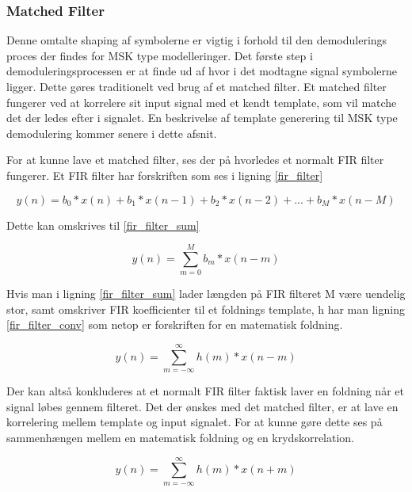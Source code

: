 \begin{appendices}
\subsubsection{Matched Filter} \label{matched_filter_heading}

Denne omtalte shaping af symbolerne er vigtig i forhold til den demodulerings proces der findes for MSK type modelleringer. Det første step i demoduleringsprocessen er at finde ud af hvor i det modtagne signal symbolerne ligger. Dette gøres traditionelt ved brug af et matched filter. Et matched filter fungerer ved at korrelere sit input signal med et kendt template, som vil matche det der ledes efter i signalet. En beskrivelse af template generering til MSK type demodulering kommer senere i dette afsnit. 

For at kunne lave et matched filter, ses der på hvorledes et normalt FIR filter fungerer. Et FIR filter har forskriften som ses i ligning \ref{fir_filter}

\begin{equation} \label{fir_filter}
y(n) = b_0 * x(n) + b_1 * x(n-1) + b_2 * x(n-2) + ... + b_M * x(n - M)
\end{equation}

Dette kan omskrives til \ref{fir_filter_sum}

\begin{equation} \label{fir_filter_sum}
y(n) = \sum_{m = 0}^{M} b_m * x(n - m)
\end{equation}

Hvis man i ligning \ref{fir_filter_sum} lader længden på FIR filteret M være uendelig stor, samt omskriver FIR koefficienter til et foldnings template, h har man ligning \ref{fir_filter_conv} som netop er forskriften for en matematisk foldning.

\begin{equation} \label{fir_filter_conv}
y(n) = \sum_{m = -\infty}^{\infty} h(m) * x(n - m)
\end{equation}

Der kan altså konkluderes at et normalt FIR filter faktisk laver en foldning når et signal løbes gennem filteret. Det der ønskes med det matched filter, er at lave en korrelering mellem template og input signalet. For at kunne gøre dette ses på sammenhængen mellem en matematisk foldning og en krydskorrelation. 

\begin{equation} \label{cross_corr}
y(n) = \sum_{m = -\infty}^{\infty} h(m) * x(n + m)
\end{equation}


\end{appendices}
